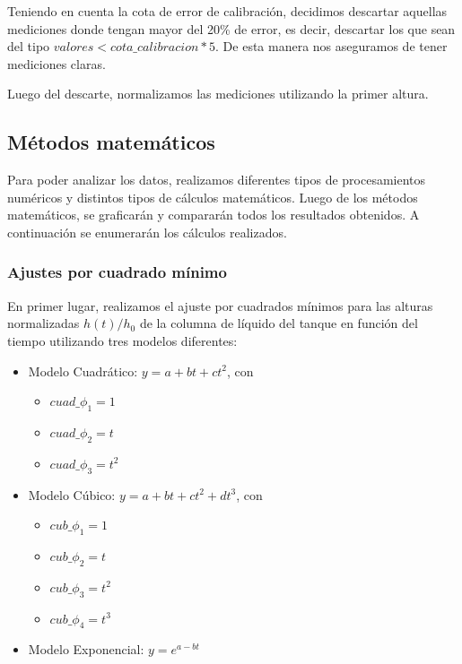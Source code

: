 \documentclass{article}
\begin{document}
Teniendo en cuenta la cota de error de calibración, decidimos descartar aquellas mediciones donde tengan mayor del 20\% de error, es decir, descartar los que sean del tipo $valores < cota\_calibracion * 5$. De esta manera nos aseguramos de tener mediciones claras. 

Luego del descarte, normalizamos las mediciones utilizando la primer altura.


\subsection{Métodos matemáticos}

Para poder analizar los datos, realizamos diferentes tipos de procesamientos numéricos y distintos tipos de cálculos matemáticos. Luego de los métodos matemáticos, se graficarán y compararán todos los resultados obtenidos. A continuación se enumerarán los cálculos realizados. 

\subsubsection{Ajustes por cuadrado mínimo}
En primer lugar, realizamos el ajuste por cuadrados mínimos para las alturas normalizadas $h(t)/h_0$ de la columna de líquido del tanque en función del tiempo utilizando tres modelos diferentes:

\begin{itemize}
    \item Modelo Cuadrático: $y = a + bt + ct^2$, con
    \begin{itemize}
        \item $cuad\_\phi_1 = 1$
        \item $cuad\_\phi_2 = t$
        \item $cuad\_\phi_3 = t^2$
    \end{itemize}
    \item Modelo Cúbico: $y = a + bt + ct^2 + dt^3$, con
    \begin{itemize}
        \item $cub\_\phi_1 = 1$
        \item $cub\_\phi_2 = t$
        \item $cub\_\phi_3 = t^2$
        \item $cub\_\phi_4 = t^3$
    \end{itemize}
    \item Modelo Exponencial: $y = e^{a-bt}$
\end{itemize}
\end{document}
